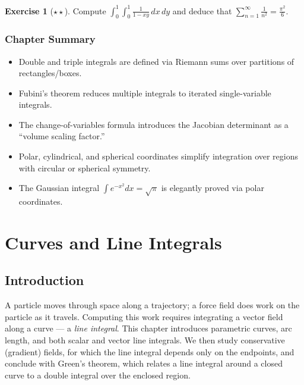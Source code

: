 \documentclass[12pt,a4paper]{book}
\theoremstyle{definition}
\newtheorem{exercise}{Exercise}[chapter]
\begin{document}
\begin{exercise}[$\star\star$]
Compute $\displaystyle\int_0^1\!\int_0^1\frac{1}{1-xy}\,dx\,dy$ and deduce that
$\displaystyle\sum_{n=1}^{\infty}\frac{1}{n^2}=\frac{\pi^2}{6}$.
\end{exercise}

\subsection*{Chapter Summary}

\begin{itemize}
  \item Double and triple integrals are defined via Riemann sums over
    partitions of rectangles/boxes.
  \item Fubini's theorem reduces multiple integrals to iterated
    single-variable integrals.
  \item The change-of-variables formula introduces the Jacobian determinant
    as a ``volume scaling factor.''
  \item Polar, cylindrical, and spherical coordinates simplify integration
    over regions with circular or spherical symmetry.
  \item The Gaussian integral $\int e^{-x^2}dx=\sqrt\pi$ is elegantly
    proved via polar coordinates.
\end{itemize}



\chapter{Curves and Line Integrals}
\label{ch:curves-line-integrals}

\section*{Introduction}

A particle moves through space along a trajectory; a force field does work
on the particle as it travels.  Computing this work requires integrating a
vector field along a curve --- a \emph{line integral}.  This chapter
introduces parametric curves, arc length, and both scalar and vector line
integrals.  We then study conservative (gradient) fields, for which the line
integral depends only on the endpoints, and conclude with Green's theorem,
which relates a line integral around a closed curve to a double integral over
the enclosed region.
\end{document}
